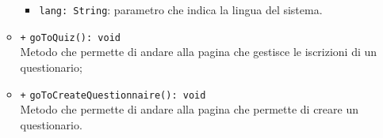 \begin{itemize}
\begin{itemize}
\begin{itemize}
			\item \texttt{lang: String}: parametro che indica la lingua del sistema. 
		\end{itemize}
		\item \texttt{+} \texttt{goToQuiz(): void} \\Metodo che permette di andare alla pagina che gestisce le iscrizioni di un questionario;
		\item \texttt{+} \texttt{goToCreateQuestionnaire(): void} \\Metodo che permette di andare alla pagina che permette di creare un questionario.		
	\end{itemize}
\end{itemize}

